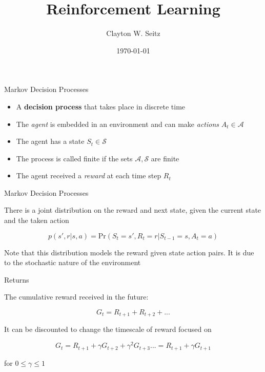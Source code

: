 \documentclass{beamer}					%
\title{Reinforcement Learning}	%
\author{Clayton W. Seitz}								%
\date{\today}									%
\begin{document}
\begin{frame}
  \titlepage
\end{frame}

\begin{frame}{Markov Decision Processes}

\begin{itemize}
\item A \textbf{decision process} that takes place in discrete time

\item The \emph{agent} is embedded in an environment and can make \emph{actions} $A_{t}\in \mathcal{A}$

\item The agent has a state $S_{t}\in \mathcal{S}$

\item The process is called finite if the sets $\mathcal{A},\mathcal{S}$ are finite

\item The agent received a \emph{reward} at each time step $R_{t}$

\end{itemize}

\end{frame}

\begin{frame}{Markov Decision Processes}

There is a joint distribution on the reward and next state, given the current state and the taken action

\begin{equation*}
p(s',r\lvert s,a) = \mathrm{Pr}\left(S_{t}=s',R_{t}=r \lvert S_{t-1}=s,A_{t}=a\right)
\end{equation*}

Note that this distribution models the reward given state action pairs. It is due to the stochastic nature of the environment

\end{frame}

\begin{frame}{Returns}

The cumulative reward received in the future:

\begin{equation*}
G_{t} = R_{t+1} + R_{t+2} + ...
\end{equation*}

It can be discounted to change the timescale of reward focused on

\begin{equation*}
G_{t} = R_{t+1} + \gamma G_{t+2} + \gamma^{2} G_{t+3} ... = R_{t+1} + \gamma G_{t+1}
\end{equation*}

for $0 \leq \gamma \leq 1$

\end{frame}
\end{document}
